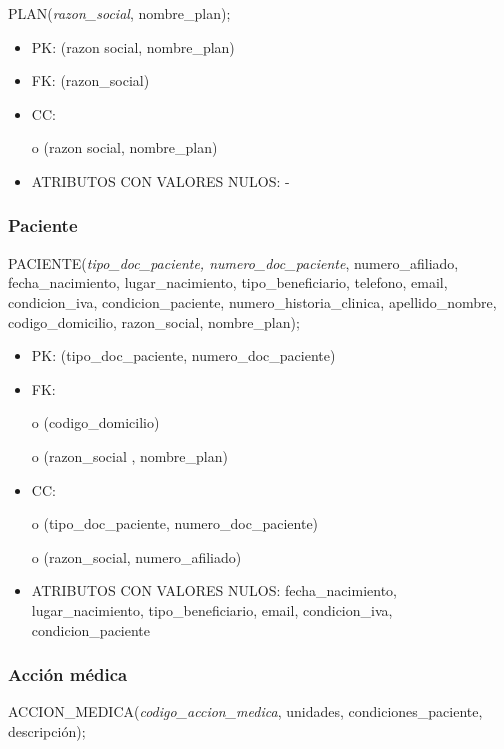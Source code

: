 \documentclass[a4paper,11pt]{article}
\begin{document}
PLAN(\emph{razon\_social}, nombre\_plan);

\begin{itemize}
\item PK: (razon social, nombre\_plan)

\item FK: (razon\_social)

\item CC:

o (razon social, nombre\_plan)

\item ATRIBUTOS CON VALORES NULOS: -\label{HToc293405835}
\end{itemize}

\subsubsection{\textbf{Paciente}}

PACIENTE(\emph{tipo\_doc\_paciente, numero\_doc\_paciente}, numero\_afiliado, fecha\_nacimiento, 
lugar\_nacimiento, tipo\_beneficiario, telefono, email, condicion\_iva, condicion\_paciente, 
numero\_historia\_clinica, apellido\_nombre, codigo\_domicilio, razon\_social, 
 nombre\_plan);

\begin{itemize}
\item PK: (tipo\_doc\_paciente, numero\_doc\_paciente)

\item FK: 

o (codigo\_domicilio) 

o (razon\_social , nombre\_plan)

\item CC:

o (tipo\_doc\_paciente, numero\_doc\_paciente)

o (razon\_social, numero\_afiliado)

\item ATRIBUTOS CON VALORES NULOS:  fecha\_nacimiento, lugar\_nacimiento, tipo\_beneficiario, 
email, condicion\_iva, condicion\_paciente\label{HToc293405836}
\end{itemize}

\subsubsection{\textbf{Acción médica}}

ACCION\_MEDICA(\emph{codigo\_accion\_medica}, unidades, condiciones\_paciente, 
descripción);
\end{document}
